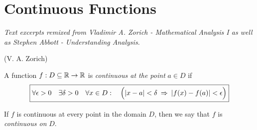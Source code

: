 \section{Continuous Functions}

\textit{Text excerpts remixed from Vladimir A. Zorich - Mathematical Analysis I as well as Stephen Abbott - Understanding Analysis.}

 (V. A. Zorich)

\begin{definition}\label{def:continuous}
    A function $f: D\subseteq \R \to \R$ is \textit{continuous at the point} $a \in D$ if
    \begin{align*}
    \boxed{
        \forall \epsilon > 0 \quad \exists \delta > 0
        \quad \forall x \in D: \quad
        \Bigl(|x - a| < \delta \: \implies \: |f(x) - f(a)| < \epsilon \Bigr)
    }
    \end{align*}

    If $f$ is continuous at every point in the domain $D$, then we say that $f$ is \textit{continuous on} $D$.
\end{definition}
